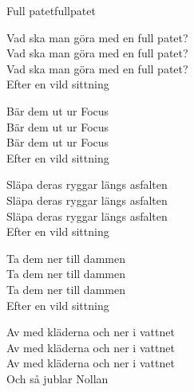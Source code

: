 \begin{song}{Full patet}{fullpatet}
\begin{vers}
Vad ska man göra med en full patet?\\
Vad ska man göra med en full patet?\\
Vad ska man göra med en full patet?\\
Efter en vild sittning\\
\end{vers}
\begin{vers}
Bär dem ut ur Focus\\
Bär dem ut ur Focus\\
Bär dem ut ur Focus\\
Efter en vild sittning\\
\end{vers}
\begin{vers}
Släpa deras ryggar längs asfalten\\
Släpa deras ryggar längs asfalten\\
Släpa deras ryggar längs asfalten\\
Efter en vild sittning
\end{vers}
\begin{vers}
Ta dem ner till dammen\\
Ta dem ner till dammen\\
Ta dem ner till dammen\\
Efter en vild sittning\\
\end{vers}
\begin{vers}
Av med kläderna och ner i vattnet\\
Av med kläderna och ner i vattnet\\
Av med kläderna och ner i vattnet\\
Och så jublar Nollan\\
\end{vers}
\end{song}